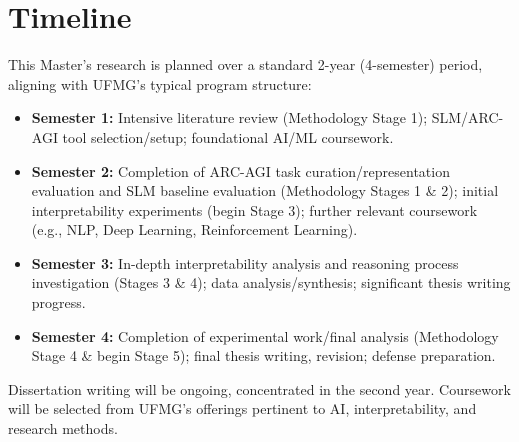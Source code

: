 \documentclass[12pt,a4paper]{article}
\begin{document}
\section*{Timeline}
This Master's research is planned over a standard 2-year (4-semester) period, aligning with UFMG's typical program structure:

\begin{itemize}
    \item \textbf{Semester 1:} Intensive literature review (Methodology Stage 1); SLM/ARC-AGI tool selection/setup; foundational AI/ML coursework.
    \item \textbf{Semester 2:} Completion of ARC-AGI task curation/representation evaluation and SLM baseline evaluation (Methodology Stages 1 \& 2); initial interpretability experiments (begin Stage 3); further relevant coursework (e.g., NLP, Deep Learning, Reinforcement Learning).
    \item \textbf{Semester 3:} In-depth interpretability analysis and reasoning process investigation (Stages 3 \& 4); data analysis/synthesis; significant thesis writing progress.
    \item \textbf{Semester 4:} Completion of experimental work/final analysis (Methodology Stage 4 \& begin Stage 5); final thesis writing, revision; defense preparation.
\end{itemize}
Dissertation writing will be ongoing, concentrated in the second year. Coursework will be selected from UFMG's offerings pertinent to AI, interpretability, and research methods.

\printbibliography
\end{document}

